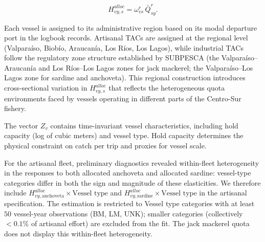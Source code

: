 \documentclass[
  11pt,
]{article}
\begin{document}
\begin{equation}
H^{alloc}_{vy,s}=\omega_{vs}^r\,\bar{Q}_{sy}^r. \label{eq:Halloc}
\end{equation}

Each vessel is assigned to its administrative region based on its modal departure port in the logbook records. Artisanal TACs are assigned at the regional level (Valparaíso, Biobío, Araucanía, Los Ríos, Los Lagos), while industrial TACs follow the regulatory zone structure established by SUBPESCA (the Valparaíso--Araucanía and Los Ríos--Los Lagos zones for jack mackerel; the Valparaíso--Los Lagos zone for sardine and anchoveta). This regional construction introduces cross-sectional variation in \(H^{alloc}_{vy,s}\) that reflects the heterogeneous quota environments faced by vessels operating in different parts of the Centro-Sur fishery.

The vector \(Z_v\) contains time-invariant vessel characteristics, including hold capacity (log of cubic meters) and vessel type. Hold capacity determines the physical constraint on catch per trip and proxies for vessel scale.

For the artisanal fleet, preliminary diagnostics revealed within-fleet heterogeneity in the responses to both allocated anchoveta and allocated sardine: vessel-type categories differ in both the sign and magnitude of these elasticities. We therefore include \(H^{alloc}_{vy,\text{anchoveta}} \times \text{Vessel type}\) and \(H^{alloc}_{vy,\text{sardine}} \times \text{Vessel type}\) in the artisanal specification. The estimation is restricted to Vessel type categories with at least \(50\) vessel-year observations (BM, LM, UNK); smaller categories (collectively \(<0.1\%\) of artisanal effort) are excluded from the fit. The jack mackerel quota does not display this within-fleet heterogeneity.
\end{document}
